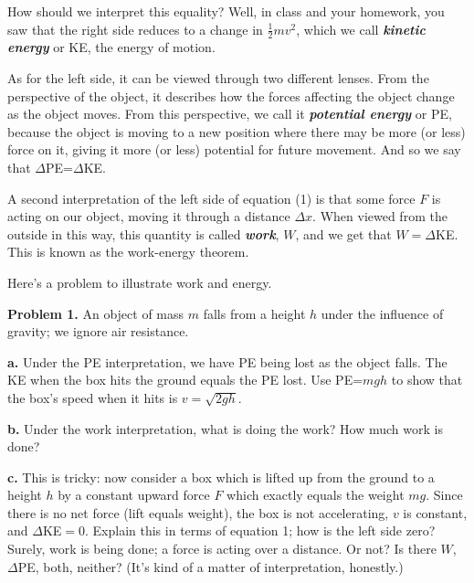 \documentclass[12pt]{article}
\begin{document}
How should we interpret this equality? Well, in class and your homework, you saw that the right side reduces to a change in $\frac{1}{2}mv^2$, which we call \textit{\textbf{kinetic energy}} or KE, the energy of motion. 

As for the left side, it can be viewed through two different lenses. From the perspective of the object, it describes how the forces affecting the object change as the object moves. From this perspective, we call it \textit{\textbf{potential energy}} or PE, because the object is moving to a new position where there may be more (or less) force on it, giving it more (or less) potential for future movement. And so we say that $\Delta$PE=$\Delta$KE.

A second interpretation of the left side of equation (1) is that some force $F$ is acting on our object, moving it through a distance $\Delta x$. When viewed from the outside in this way, this quantity is called \textbf{\textit{work}}, $W$, and we get that $W=\Delta$KE. This is known as the work-energy theorem. 

Here's a problem to illustrate work and energy.

\textbf{Problem 1.} An object of mass $m$ falls from a height $h$ under the influence of gravity; we ignore air resistance. 

\textbf{a.} Under the PE interpretation, we have PE being lost as the object falls. The KE when the box hits the ground equals the PE lost. Use PE=$mgh$ to show that the box's speed when it hits is $v=\sqrt{2gh}$. 

\textbf{b.}  Under the work interpretation, what is doing the work? How much work is done?

\textbf{c.} This is tricky: now consider a box which is lifted up from the ground to a height $h$ by a constant upward force $F$ which exactly equals the weight $mg$. Since there is no net force (lift equals weight), the box is not accelerating, $v$ is constant, and $\Delta$KE$=0$. Explain this in terms of equation 1; how is the left side zero? Surely, work is being done; a force is acting over a distance. Or not? Is there $W$, $\Delta$PE, both, neither? (It's kind of a matter of interpretation, honestly.)
 
\end{document}
